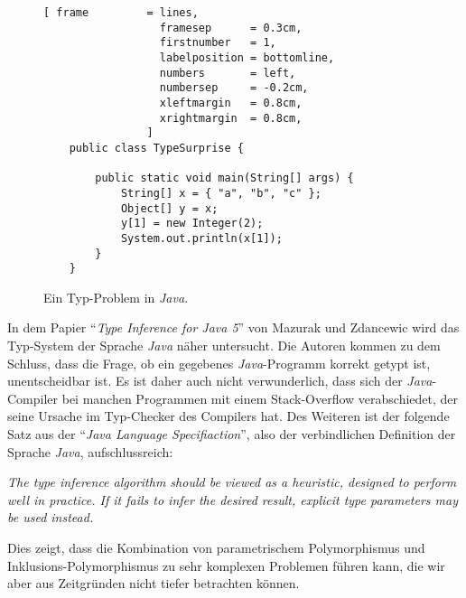 \begin{figure}[!ht]
\centering
\begin{Verbatim}[ frame         = lines, 
                  framesep      = 0.3cm, 
                  firstnumber   = 1,
                  labelposition = bottomline,
                  numbers       = left,
                  numbersep     = -0.2cm,
                  xleftmargin   = 0.8cm,
                  xrightmargin  = 0.8cm,
                ]
    public class TypeSurprise {
    
        public static void main(String[] args) {
            String[] x = { "a", "b", "c" };
            Object[] y = x;
            y[1] = new Integer(2);
            System.out.println(x[1]);
        }
    }
\end{Verbatim}
\vspace*{-0.3cm}
\caption{Ein Typ-Problem in \textsl{Java}.}
\label{fig:TypeSurprise.java}
\end{figure}
In dem Papier ``\emph{Type Inference for Java 5}''  von Mazurak und Zdancewic wird das Typ-System
der Sprache \textsl{Java} n\"aher untersucht.  Die Autoren kommen zu dem Schluss, dass die Frage, ob
ein gegebenes \textsl{Java}-Programm korrekt getypt ist, unentscheidbar ist.  Es ist daher auch
nicht verwunderlich,  dass sich der \textsl{Java}-Compiler bei manchen Programmen mit einem
Stack-Overflow verabschiedet, der seine Ursache im Typ-Checker des Compilers hat.
Des Weiteren ist der folgende Satz aus der ``\textsl{Java Language Specifiaction}'', also
der verbindlichen Definition der Sprache \textsl{Java}, aufschlussreich:
\vspace*{0.3cm}

\begin{minipage}[c]{0.9\linewidth}
{\em
The type inference algorithm should be viewed as a heuristic, designed to perform well in
practice. If it fails to infer the desired result, explicit type parameters may be used
instead.   
}  
\end{minipage}

\vspace*{0.3cm}
\noindent
Dies zeigt, dass die Kombination von parametrischem Polymorphismus und Inklusions-Polymor\-phismus zu
sehr komplexen Problemen f\"uhren kann, die wir aber aus Zeitgr\"unden nicht tiefer betrachten k\"onnen.



